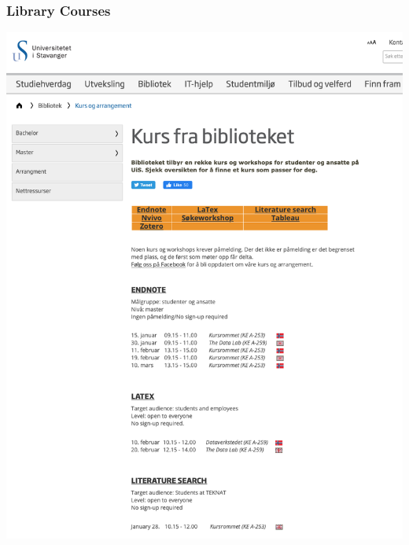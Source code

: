 \documentclass[hyperref={pdfpagelabels=false}, aspectratio=1610,handout]{beamer}
\begin{document}
\begin{frame}
\frametitle{Library Courses}
 \begin{center}
  \includegraphics[scale=0.25]{fig/LibraryCourses}
 \end{center}
\end{frame}
\end{document}
